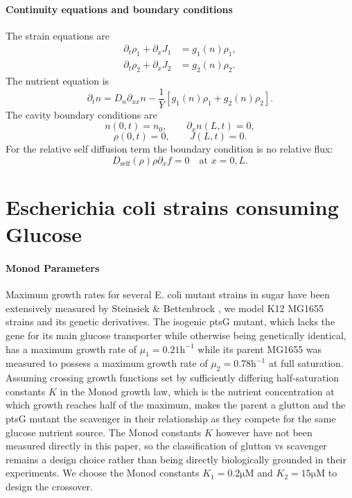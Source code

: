 \documentclass[11pt,a4paper]{report}
\newcommand{\Dself}{D_{\mathrm{self}}}
\newcommand{\pd}{\partial}
\begin{document}
\paragraph{Continuity equations and boundary conditions}
The strain equations are
\begin{align}
	\pd_t\rho_1+\pd_xJ_1 &= g_1(n)\rho_1,
	\label{eq:rho1-eq}\\
	\pd_t\rho_2+\pd_xJ_2 &= g_2(n)\rho_2.
	\label{eq:rho2-eq}
\end{align}
The nutrient equation is
\begin{equation}
	\pd_t n=D_n\pd_{xx}n-\frac1Y\left[g_1(n)\rho_1+g_2(n)\rho_2\right].
	\label{eq:nutrient-eq}
\end{equation}
The cavity boundary conditions are
\begin{equation}
	n(0,t)=n_0,
	\qquad
	\pd_x n(L,t)=0,
	\label{eq:nutrient-bc}
\end{equation}
\begin{equation}
	\rho(0,t)=0,
	\qquad
	J(L,t)=0.
	\label{eq:biomass-bc}
\end{equation}
For the relative self diffusion term the boundary condition is no relative flux:
\begin{equation}
	\Dself(\rho)\rho\pd_x f=0
	\quad\text{at }x=0,L.
	\label{eq:relative-bc}
\end{equation}
	\section{Escherichia coli strains consuming Glucose} 
	\label{sec:ecoli} 
	\paragraph{Monod Parameters}
	Maximum growth rates for several E. coli mutant strains in sugar have been extensively measured by Steinsiek \& Bettenbrock \cite{Steinsiek}, we model K12 MG1655 strains and its genetic derivatives. The isogenic ptsG mutant, which lacks the gene for its main glucose transporter while otherwise being genetically identical, has a maximum growth rate of $\mu_{1}=0.21 \mathrm{h^{-1}}$ while its parent MG1655 was measured to possess a maximum growth rate of $\mu_{2}=0.78\mathrm{h^{-1}}$ at full saturation. Assuming crossing growth functions set by sufficiently differing half-saturation constants $K$ in the Monod growth law, which is the nutrient concentration at which growth reaches half of the maximum, makes the parent a glutton and the ptsG mutant the scavenger in their relationship as they compete for the same glucose nutrient source. The Monod constants $K$ however have not been measured directly in this paper, so the classification of glutton vs scavenger remains a design choice rather than being directly biologically grounded in their experiments. We choose the Monod constants $K_{1}=0.2 \mathrm{\mu M}$ and $K_{2}=15 \mathrm{\mu M}$ to design the crossover.
\end{document}
